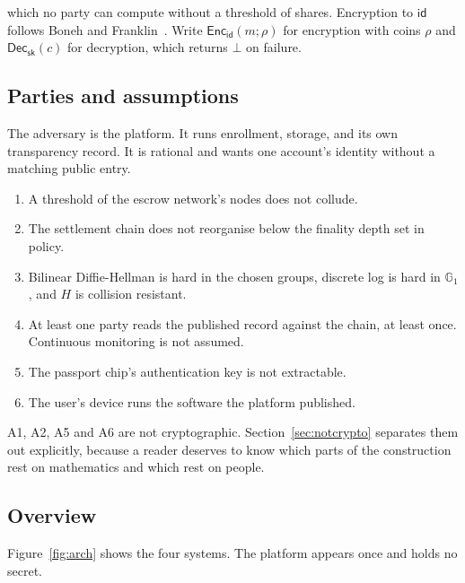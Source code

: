\documentclass[11pt,a4paper]{article}
\begin{document}
which no party can compute without a threshold of shares. Encryption to
$\mathsf{id}$ follows Boneh and Franklin~\cite{bf}. Write
$\mathsf{Enc}_{\mathsf{id}}(m; \rho)$ for encryption with coins $\rho$ and
$\mathsf{Dec}_{\mathsf{sk}}(c)$ for decryption, which returns $\bot$ on failure.

\subsection{Parties and assumptions}

The adversary is the platform. It runs enrollment, storage, and its own
transparency record. It is rational and wants one account's identity without a
matching public entry.

\begin{enumerate}
  \item[A1] A threshold of the escrow network's nodes does not collude.
  \item[A2] The settlement chain does not reorganise below the finality depth set
        in policy.
  \item[A3] Bilinear Diffie-Hellman is hard in the chosen groups, discrete log is
        hard in $\mathbb{G}_1$, and $H$ is collision resistant.
  \item[A4] At least one party reads the published record against the chain, at
        least once. Continuous monitoring is not assumed.
  \item[A5] The passport chip's authentication key is not extractable.
  \item[A6] The user's device runs the software the platform published.
\end{enumerate}

A1, A2, A5 and A6 are not cryptographic. Section~\ref{sec:notcrypto} separates
them out explicitly, because a reader deserves to know which parts of the
construction rest on mathematics and which rest on people.

\subsection{Overview}

Figure~\ref{fig:arch} shows the four systems. The platform appears once and holds
no secret.
\end{document}
